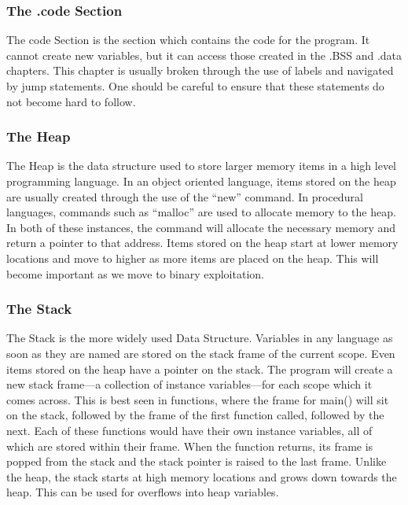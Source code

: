					\subsubsection{The .code Section}
						The code Section is the section which contains the code for the program.
						It cannot create new variables, but it can access those created in the .BSS and .data chapters.
						This chapter is usually broken through the use of labels and navigated by jump statements.
						One should be careful to ensure that these statements do not become hard to follow.
					\subsubsection{The Heap}
						The Heap is the data structure used to store larger memory items in a high level programming language.
						In an object oriented language, items stored on the heap are usually created through the use of the ``new'' command.
						In procedural languages, commands such as ``malloc'' are used to allocate memory to the heap.
						In both of these instances, the command will allocate the necessary memory and return a pointer to that address.
						Items stored on the heap start at lower memory locations and move to higher as more items are placed on the heap.
						This will become important as we move to binary exploitation.
					\subsubsection{The Stack}
						The Stack is the more widely used Data Structure.
						Variables in any language as soon as they are named are stored on the stack frame of the current scope.
						Even items stored on the heap have a pointer on the stack.
						The program will create a new stack frame---a collection of instance variables---for each scope which it comes across.
						This is best seen in functions, where the frame for main() will sit on the stack, followed by the frame of the first function called, followed by the next.
						Each of these functions would have their own instance variables, all of which are stored within their frame.
						When the function returns, its frame is popped from the stack and the stack pointer is raised to the last frame.
						Unlike the heap, the stack starts at high memory locations and grows down towards the heap.
						This can be used for overflows into heap variables.
